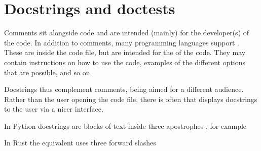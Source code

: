 \documentclass[letterpaper,10pt,british]{sphinxmanual}
\begin{document}
\section{Docstrings and doctests}
\label{\detokenize{chapters/software_development_tools/docstrings:docstrings-and-doctests}}\label{\detokenize{chapters/software_development_tools/docstrings::doc}}
\sphinxAtStartPar
Comments sit alongside code and are intended (mainly) for the developer(s) of the code. In addition to comments, many programming languages support . These are inside the code file, but are intended for the  of the code. They may contain instructions on how to use the code, examples of the different options that are possible, and so on.

\sphinxAtStartPar
Docstrings thus complement comments, being aimed for a different audience. Rather than the user opening the code file, there is often {\hyperref[\detokenize{chapters/software_development_tools/documentation_tools:documentation-tools}]{}} that displays docstrings to the user via a nicer interface.

\sphinxAtStartPar
In Python docstrings are blocks of text inside three apostrophes , for example

\begin{sphinxVerbatim}[commandchars=\\\{\}]
\end{sphinxVerbatim}

\sphinxAtStartPar
In Rust the equivalent uses three forward slashes 

\begin{sphinxVerbatim}[commandchars=\\\{\}]
\end{sphinxVerbatim}
\end{document}
